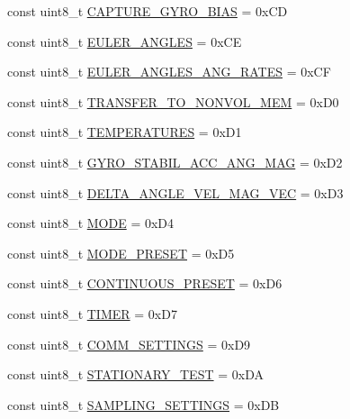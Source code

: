 \begin{DoxyCompactItemize}
\item 
const uint8\-\_\-t \hyperlink{namespace_u_s_u_a92bab9f2a72649fb48c86fd407ef8c59}{\-C\-A\-P\-T\-U\-R\-E\-\_\-\-G\-Y\-R\-O\-\_\-\-B\-I\-A\-S} = 0x\-C\-D
\item 
const uint8\-\_\-t \hyperlink{namespace_u_s_u_a6d35ce7963dec25cc43e551dccd71453}{\-E\-U\-L\-E\-R\-\_\-\-A\-N\-G\-L\-E\-S} = 0x\-C\-E
\item 
const uint8\-\_\-t \hyperlink{namespace_u_s_u_af604e3d925c2fe95f8a6b1af3f79d2d0}{\-E\-U\-L\-E\-R\-\_\-\-A\-N\-G\-L\-E\-S\-\_\-\-A\-N\-G\-\_\-\-R\-A\-T\-E\-S} = 0x\-C\-F
\item 
const uint8\-\_\-t \hyperlink{namespace_u_s_u_a440c70222186b93e58fd4448cecb2ad2}{\-T\-R\-A\-N\-S\-F\-E\-R\-\_\-\-T\-O\-\_\-\-N\-O\-N\-V\-O\-L\-\_\-\-M\-E\-M} = 0x\-D0
\item 
const uint8\-\_\-t \hyperlink{namespace_u_s_u_ac5f57d308aea3cdda7c0a2ddade6996b}{\-T\-E\-M\-P\-E\-R\-A\-T\-U\-R\-E\-S} = 0x\-D1
\item 
const uint8\-\_\-t \hyperlink{namespace_u_s_u_a21b21aa9bf4f65bb8f89f61c853b0d65}{\-G\-Y\-R\-O\-\_\-\-S\-T\-A\-B\-I\-L\-\_\-\-A\-C\-C\-\_\-\-A\-N\-G\-\_\-\-M\-A\-G} = 0x\-D2
\item 
const uint8\-\_\-t \hyperlink{namespace_u_s_u_a18e6e53c69e61c3538c351bb86c77629}{\-D\-E\-L\-T\-A\-\_\-\-A\-N\-G\-L\-E\-\_\-\-V\-E\-L\-\_\-\-M\-A\-G\-\_\-\-V\-E\-C} = 0x\-D3
\item 
const uint8\-\_\-t \hyperlink{namespace_u_s_u_afb689aa4352de24daaa765fd9e625ae3}{\-M\-O\-D\-E} = 0x\-D4
\item 
const uint8\-\_\-t \hyperlink{namespace_u_s_u_afc9a1298a3210c69931db151aaf35de7}{\-M\-O\-D\-E\-\_\-\-P\-R\-E\-S\-E\-T} = 0x\-D5
\item 
const uint8\-\_\-t \hyperlink{namespace_u_s_u_a5bc881189e111127f0bd759100dbab6b}{\-C\-O\-N\-T\-I\-N\-U\-O\-U\-S\-\_\-\-P\-R\-E\-S\-E\-T} = 0x\-D6
\item 
const uint8\-\_\-t \hyperlink{namespace_u_s_u_abed08045a54f63e04380a2ac80bcaf79}{\-T\-I\-M\-E\-R} = 0x\-D7
\item 
const uint8\-\_\-t \hyperlink{namespace_u_s_u_a3709ea83b0ef142216dad235ed73a34b}{\-C\-O\-M\-M\-\_\-\-S\-E\-T\-T\-I\-N\-G\-S} = 0x\-D9
\item 
const uint8\-\_\-t \hyperlink{namespace_u_s_u_aa13337d52a46707f63911e7c2972971b}{\-S\-T\-A\-T\-I\-O\-N\-A\-R\-Y\-\_\-\-T\-E\-S\-T} = 0x\-D\-A
\item 
const uint8\-\_\-t \hyperlink{namespace_u_s_u_aeb8ec20b4bb74ff2895ab487c29810e0}{\-S\-A\-M\-P\-L\-I\-N\-G\-\_\-\-S\-E\-T\-T\-I\-N\-G\-S} = 0x\-D\-B

\end{DoxyCompactItemize}
